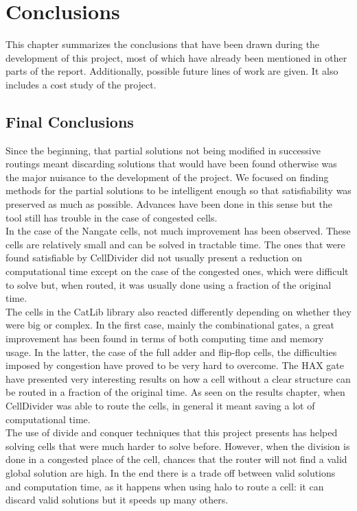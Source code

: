 \chapter{Conclusions}
\label{cha:conclusions}

This chapter summarizes the conclusions that have been drawn during the development of this project, most of which have already been mentioned in other parts of the report. Additionally, possible future lines of work are given. It also includes a cost study of the project.  \\

\section{Final Conclusions}

Since the beginning, that partial solutions not being modified in successive routings meant discarding solutions that would have been found otherwise was the major nuisance to the development of the project. We focused on finding methods for the partial solutions to be intelligent enough so that satisfiability was preserved as much as possible. Advances have been done in this sense but the tool still has trouble in the case of congested cells. \\

In the case of the Nangate cells, not much improvement has been observed. These cells are relatively small and can be solved in tractable time. The ones that were found satisfiable by CellDivider did not usually present a reduction on computational time except on the case of the congested ones, which were difficult to solve but, when routed, it was usually done using a fraction of the original time. \\

The cells in the CatLib library also reacted differently depending on whether they were big or complex. In the first case, mainly the combinational gates, a great improvement has been found in terms of both computing time and memory usage. In the latter, the case of the full adder and flip-flop cells, the difficulties imposed by congestion have proved to be very hard to overcome. The HAX gate have presented very interesting results on how a cell without a clear structure can be routed in a fraction of the original time. As seen on the results chapter, when CellDivider was able to route the cells, in general it meant saving a lot of computational time. \\

The use of divide and conquer techniques that this project presents has helped solving cells that were much harder to solve before. However, when the division is done in a congested place of the cell, chances that the router will not find a valid global solution are high. In the end there is a trade off between valid solutions and computation time, as it happens when using halo to route a cell: it can discard valid solutions but it speeds up many others. \\

